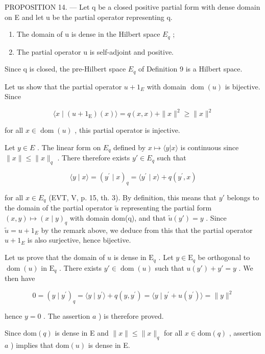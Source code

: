 PROPOSITION 14. --- Let q be a closed positive partial form with dense domain on E and let u be the partial operator representing q.

\begin{enumerate}
\def\labelenumi{\alph{enumi})}
\item
  The domain of u is dense in the Hilbert space \(E_{q}\) ;
\item
  The partial operator u is self-adjoint and positive.
\end{enumerate}

Since q is closed, the pre-Hilbert space \(E_{q}\) of Definition 9 is a Hilbert space.

Let us show that the partial operator \(u + 1_{E}\) with domain \(\operatorname{dom}(u)\) is bijective. Since

\[
\langle x \mid (u + 1 _ {\mathrm{E}}) (x) \rangle = q (x, x) + \| x \| ^ {2} \geqslant \| x \| ^ {2}
\]

for all \(x \in \operatorname{dom}(u)\) , this partial operator is injective.

Let \(y \in E\) . The linear form on \(E_{q}\) defined by \(x \mapsto \langle y | x \rangle\) is continuous since \(\|x\| \leqslant \|x\|_{q}\) . There therefore exists \(y' \in E_{q}\) such that

\[
\langle y \mid x \rangle = (y ^ {\prime} \mid x) _ {q} = \langle y ^ {\prime} \mid x \rangle + q (y ^ {\prime}, x)
\]

for all \(x \in E_{q}\) (EVT, V, p. 15, th. 3). By definition, this means that \(y'\) belongs to the domain of the partial operator \(\widetilde{u}\) representing the partial form \((x, y) \mapsto (x \mid y)_{q}\) with domain dom(q), and that \(\widetilde{u}(y') = y\) . Since \(\widetilde{u} = u + 1_{E}\) by the remark above, we deduce from this that the partial operator \(u + 1_{E}\) is also surjective, hence bijective.

Let us prove that the domain of \(u\) is dense in \(\mathrm{E}_q\) . Let \(y \in \mathrm{E}_q\) be orthogonal to \(\operatorname{dom}(u)\) in \(\mathrm{E}_q\) . There exists \(y' \in \operatorname{dom}(u)\) such that \(u(y') + y' = y\) . We then have

\[
0 = (y \mid y ^ {\prime}) _ {q} = \langle y \mid y ^ {\prime} \rangle + q (y, y ^ {\prime}) = \langle y \mid y ^ {\prime} + u (y ^ {\prime}) \rangle = \| y \| ^ {2}
\]

hence \(y = 0\) . The assertion \(a\) ) is therefore proved.

Since \(\mathrm{dom}(q)\) is dense in E and \(\| x\| \leqslant \| x\| _q\) for all \(x\in \mathrm{dom}(q)\) , assertion \(a\) ) implies that \(\mathrm{dom}(u)\) is dense in E.

